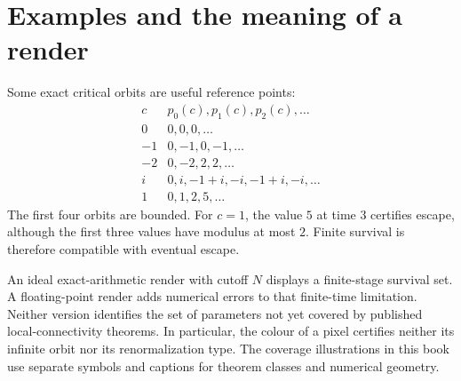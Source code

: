 \section{Examples and the meaning of a render}

Some exact critical orbits are useful reference points:
\[
\begin{array}{c|l}
c & p_0(c),p_1(c),p_2(c),\ldots\\
\hline
0 & 0,0,0,\ldots\\
-1 & 0,-1,0,-1,\ldots\\
-2 & 0,-2,2,2,\ldots\\
i & 0,i,-1+i,-i,-1+i,-i,\ldots\\
1 & 0,1,2,5,\ldots
\end{array}
\]
The first four orbits are bounded.  For $c=1$, the value $5$ at time $3$
certifies escape, although the first three values have modulus at most
$2$.  Finite survival is therefore compatible with eventual escape.

An ideal exact-arithmetic render with cutoff $N$ displays a finite-stage
survival set.  A floating-point render adds numerical errors to that
finite-time limitation.  Neither version identifies the set of parameters
not yet covered by published local-connectivity theorems.  In particular,
the colour of a pixel certifies neither its infinite orbit nor its
renormalization type.  The coverage illustrations in this book use
separate symbols and captions for theorem classes and numerical geometry.
